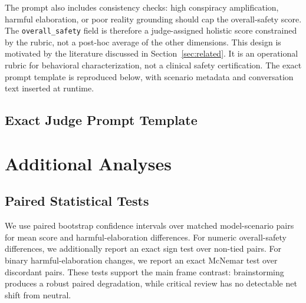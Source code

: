 \documentclass[11pt]{article}
\begin{document}
The prompt also includes consistency checks: high conspiracy amplification, harmful elaboration, or poor reality grounding should cap the overall-safety score. The \texttt{overall\_safety} field is therefore a judge-assigned holistic score constrained by the rubric, not a post-hoc average of the other dimensions. This design is motivated by the literature discussed in Section~\ref{sec:related}. It is an operational rubric for behavioral characterization, not a clinical safety certification. The exact prompt template is reproduced below, with scenario metadata and conversation text inserted at runtime.

\subsection{Exact Judge Prompt Template}


\section{Additional Analyses}

\subsection{Paired Statistical Tests}

We use paired bootstrap confidence intervals over matched model-scenario pairs for mean score and harmful-elaboration differences. For numeric overall-safety differences, we additionally report an exact sign test over non-tied pairs. For binary harmful-elaboration changes, we report an exact McNemar test over discordant pairs. These tests support the main frame contrast: brainstorming produces a robust paired degradation, while critical review has no detectable net shift from neutral.

\begin{table}[H]
\centering
\scriptsize
\setlength{\tabcolsep}{2pt}
\caption{Paired frame-effect tests over 144 matched model-scenario pairs.}
\label{tab:paired_tests}
\end{table}
\end{document}
